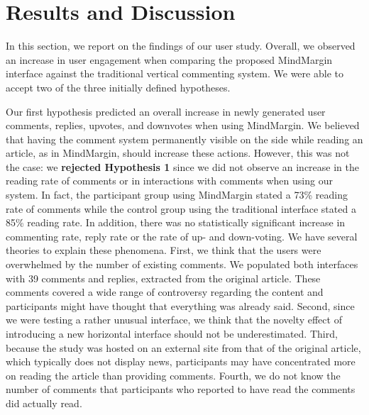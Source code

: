 \section{Results and Discussion}

In this section, we report on the findings of our user study. Overall, we observed an increase in user engagement when comparing the proposed MindMargin interface against the traditional vertical commenting system. We were able to accept two of the three initially defined hypotheses.

Our first hypothesis predicted an overall increase in newly generated user comments, replies, upvotes, and downvotes when using MindMargin. We believed that having the comment system permanently visible on the side while reading an article, as in MindMargin, should increase these actions. However, this was not the case: we \textbf{rejected Hypothesis 1} since we did not observe an increase in the reading rate of comments or in interactions with comments when using our system. In fact, the participant group using MindMargin stated a 73\% reading rate of comments while the control group using the traditional interface stated a 85\% reading rate. In addition, there was no statistically significant increase in commenting rate, reply rate or the rate of up- and down-voting. We have several theories to explain these phenomena. First, we think that the users were overwhelmed by the number of existing comments. We populated both interfaces with 39 comments and replies, extracted from the original article. These comments covered a wide range of controversy regarding the content and participants might have thought that everything was already said. Second, since we were testing a rather unusual interface, we think that the novelty effect of introducing a new horizontal interface should not be underestimated. Third, because the study was hosted on an external site from that of the original article, which typically does not display news, participants may have concentrated more on reading the article than providing comments. Fourth, we do not know the number of comments that participants who reported to have read the comments did actually read.

